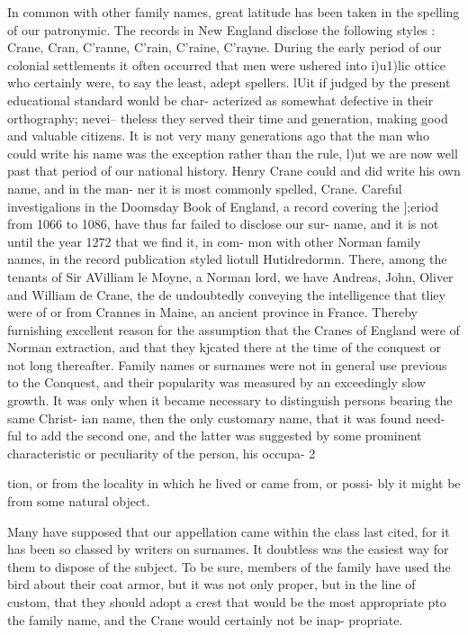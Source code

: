 In common with other family names, great latitude has been 
taken in the spelling of our patronymic. The records in New 
England disclose the following styles : Crane, Cran, C'ranne, 
C'rain, C'raine, C'rayne. During the early period of our colonial 
settlements it often occurred that men were ushered into i)u1)lic 
ottice who certainly were, to say the least, adept spellers. lUit 
if judged by the present educational standard wonld be char- 
acterized as somewhat defective in their orthography; nevei-- 
theless they served their time and generation, making good and 
valuable citizens. It is not very many generations ago that the 
man who could write his name was the exception rather than the 
rule, l)ut we are now well past that period of our national history. 
Henry Crane could and did write his own name, and in the man- 
ner it is most commonly spelled, Crane. Careful investigalions 
in the Doomsday Book of England, a record covering the ];eriod 
from 1066 to 1086, have thus far failed to disclose our sur- 
name, and it is not until the year 1272 that we find it, in com- 
mon with other Norman family names, in the record publication 
styled liotull Hutidredormn. There, among the tenants of Sir 
AVilliam le Moyne, a Norman lord, we have Andreas, John, 
Oliver and William de Crane, the de undoubtedly conveying the 
intelligence that tliey were of or from Crannes in Maine, an 
ancient province in France. Thereby furnishing excellent reason 
for the assumption that the Cranes of England were of Norman 
extraction, and that they kjcated there at the time of the conquest 
or not long thereafter. Family names or surnames were not in 
general use previous to the Conquest, and their popularity was 
measured by an exceedingly slow growth. It was only when it 
became necessary to distinguish persons bearing the same Christ- 
ian name, then the only customary name, that it was found need- 
ful to add the second one, and the latter was suggested by some 
prominent characteristic or peculiarity of the person, his occupa- 
2 




tion, or from the locality in which he lived or came from, or possi- 
bly it might be from some natural object. 

Many have supposed that our appellation came within the class 
last cited, for it has been so classed by writers on surnames. It 
doubtless was the easiest way for them to dispose of the subject. 
To be sure, members of the family have used the bird about their 
coat armor, but it was not only proper, but in the line of custom, 
that they should adopt a crest that would be the most appropriate 
pto the family name, and the Crane would certainly not be inap- 
propriate. 

